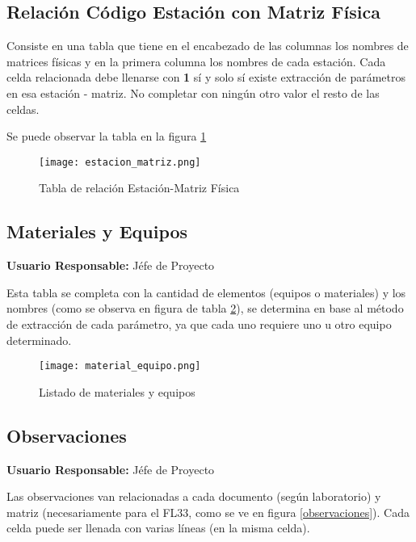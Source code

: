 \subsection{Relación Código Estación con Matriz Física} 

Consiste en una tabla que tiene en el encabezado de las columnas los nombres de matrices físicas y en la primera columna los nombres de cada estación. Cada celda relacionada debe llenarse con \textbf{1} sí y solo sí existe extracción de parámetros en esa estación - matriz. No completar con ningún otro valor el resto de las celdas.

Se puede observar la tabla en la figura \ref{estacion_matriz}

\begin{landscape}
\begin{figure}
	\centering
	\texttt{[image: estacion\_matriz.png]}
	\caption{Tabla de relación Estación-Matriz Física}
	\label{estacion_matriz}
\end{figure}
\end{landscape}

\subsection{Materiales y Equipos}

\textbf{Usuario Responsable:} Jéfe de Proyecto

Esta tabla se completa con la cantidad de elementos (equipos o materiales) y los nombres (como se observa en figura de tabla \ref{material_equipo}), se determina en base al método de extracción de cada parámetro, ya que cada uno requiere uno u otro equipo determinado.

\begin{figure}
	\centering
	\texttt{[image: material\_equipo.png]}
	\caption{Listado de materiales y equipos}
	\label{material_equipo}
\end{figure}


\subsection{Observaciones}

\textbf{Usuario Responsable:} Jéfe de Proyecto

Las observaciones van relacionadas a cada documento (según laboratorio) y matriz (necesariamente para el FL33, como se ve en figura \ref{observaciones}). Cada celda puede ser llenada con varias líneas (en la misma celda).

